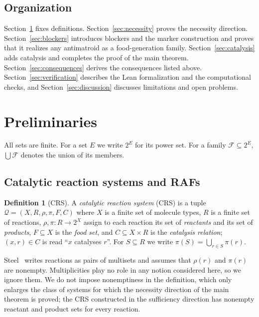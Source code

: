 \documentclass[11pt,a4paper]{article}
\theoremstyle{plain}
\theoremstyle{definition}
\newtheorem{definition}[theorem]{Definition}
\theoremstyle{remark}
\newcommand{\cF}{\mathcal{F}}
\newcommand{\cQ}{\mathcal{Q}}
\newcommand{\pw}[1]{2^{#1}}
\begin{document}
\subsection*{Organization}

Section~\ref{sec:prelim} fixes definitions. Section~\ref{sec:necessity} proves the necessity direction. Section~\ref{sec:blockers} introduces blockers and the marker construction and proves that it realizes any antimatroid as a food-generation family. Section~\ref{sec:catalysis} adds catalysis and completes the proof of the main theorem. Section~\ref{sec:consequences} derives the consequences listed above. Section~\ref{sec:verification} describes the Lean formalization and the computational checks, and Section~\ref{sec:discussion} discusses limitations and open problems.

\section{Preliminaries}\label{sec:prelim}

All sets are finite. For a set $E$ we write $\pw{E}$ for its power set. For a family $\cF\subseteq\pw{E}$, $\bigcup\cF$ denotes the union of its members.

\subsection{Catalytic reaction systems and RAFs}\label{sec:crs}

\begin{definition}[CRS]
A \emph{catalytic reaction system} (CRS) is a tuple $\cQ=(X,R,\rho,\pi,F,C)$ where $X$ is a finite set of molecule types, $R$ is a finite set of reactions, $\rho,\pi\colon R\to\pw{X}$ assign to each reaction its set of \emph{reactants} and its set of \emph{products}, $F\subseteq X$ is the \emph{food set}, and $C\subseteq X\times R$ is the \emph{catalysis relation}; $(x,r)\in C$ is read ``$x$ catalyses $r$''. For $S\subseteq R$ we write $\pi(S)=\bigcup_{r\in S}\pi(r)$.
\end{definition}

Steel~\cite{steel2023interior} writes reactions as pairs of multisets and assumes that $\rho(r)$ and $\pi(r)$ are nonempty. Multiplicities play no role in any notion considered here, so we ignore them. We do not impose nonemptiness in the definition, which only enlarges the class of systems for which the necessity direction of the main theorem is proved; the CRS constructed in the sufficiency direction has nonempty reactant and product sets for every reaction.
\end{document}
